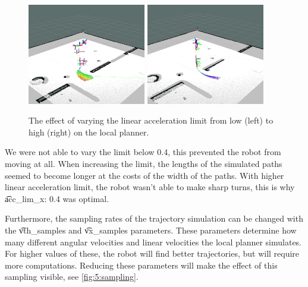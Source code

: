 \begin{figure}
	\centering
	\includegraphics[width=0.46\textwidth]{./img/lowlinearA}
	\includegraphics[width=0.46\textwidth]{./img/highlinearA}
	\caption{The effect of varying the linear acceleration limit from low (left) to high (right) on the local planner.}
	\label{fig:5:acc_lim_x}
\end{figure}

We were not able to vary the limit below 0.4, this prevented the robot from moving at all. When increasing the limit, the lengths of the simulated paths seemed to become longer at the costs of the width of the paths. With higher linear acceleration limit, the robot wasn't able to make sharp turns, this is why \t{acc_lim_x: 0.4} was optimal.

Furthermore, the sampling rates of the trajectory simulation can be changed with the \t{vth_samples} and \t{vx_samples} parameters. These parameters determine how many different angular velocities and linear velocities the local planner simulates. For higher values of these, the robot will find better trajectories, but will require more computations. Reducing these parameters will make the effect of this sampling visible, see \cref{fig:5:sampling}.

